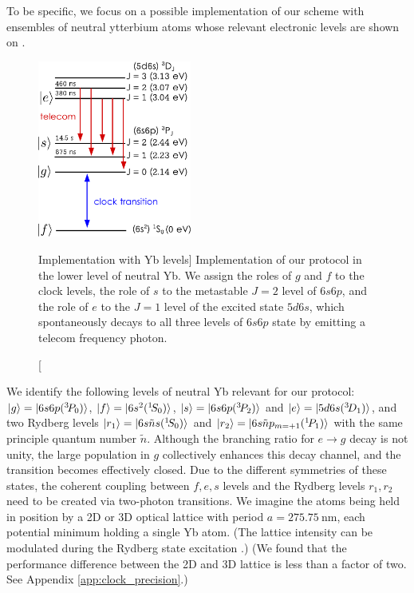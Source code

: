 To be specific, we focus on a possible implementation of our scheme with
ensembles of neutral ytterbium atoms whose relevant electronic levels are shown on
.
\begin{figure}[h]
\centering
\includegraphics[width=0.45\textwidth]{./figs_Komar2015/Yb_levels.pdf}
\caption
[Implementation with Yb levels]
{ 
\label{fig:Yb_levels}
Implementation of our protocol in the lower level of neutral Yb. We assign
the roles of $g$ and $f$ to the clock levels, the role of $s$ to the metastable
$J=2$ level of $6s6p$, and the role of $e$ to the $J=1$ level of the excited
state $5d6s$, which spontaneously decays to all three levels of $6s6p$ state by
emitting a telecom frequency photon.}
\end{figure}
We identify the  following levels of neutral
Yb  relevant for our protocol:
$| g \rangle =
| 6s6p({}^3\!P_0) \rangle$, $| f \rangle = | 6s^2({}^1\!S_0) \rangle$, $| s \rangle =
| 6s6p({}^3\!P_2) \rangle$ and $| e \rangle = | 5d6s({}^3\!D_1) \rangle$, and two Rydberg
levels $| r_1 \rangle = | 6s\tilde n s({}^1\!S_0) \rangle$ and $| r_2 \rangle =
| 6s\tilde n p_{m=+1}({}^1\!P_1) \rangle$ with the same principle
quantum number $\tilde n$. 
Although the branching ratio for $e\rightarrow g$ decay is not unity, the
large population in $g$ collectively enhances this decay channel, and the
transition becomes effectively closed. Due to the different symmetries of these
states, the coherent coupling between $f,e, s$ levels and the Rydberg levels
$r_1, r_2$ need to be created via two-photon transitions. We imagine the atoms
being held in position by a 2D or 3D optical lattice with period $a =
275.75~\mathrm{nm}$, each potential minimum holding a single Yb atom. (The lattice
intensity can be modulated during the Rydberg state excitation
\cite{Tiecke2014}.)  (We found that the performance difference between the 2D
and 3D lattice is less than a factor of two. See Appendix \ref{app:clock_precision}.)
 
